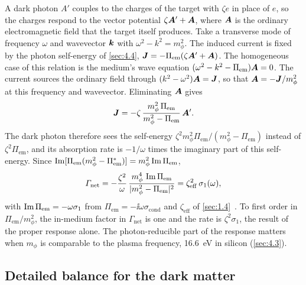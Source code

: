 A dark photon $A'$ couples to the charges of the target with $\zeta e$ in place of $e$, so the charges respond to the vector potential $\zeta\bm{A}' + \bm{A}$, where $\bm{A}$ is the ordinary electromagnetic field that the target itself produces. Take a transverse mode of frequency $\omega$ and wavevector $\bm{k}$ with $\omega^2 - k^2 = m_\phi^2$. The induced current is fixed by the photon self-energy of \cref{sec:4.4}, $\bm{J} = -\Pi_{\mathrm{em}}(\zeta\bm{A}' + \bm{A})$. The homogeneous case of this relation is the medium's wave equation $(\omega^2 - k^2 - \Pi_{\mathrm{em}})\bm{A} = 0$. The current sources the ordinary field through $(k^2 - \omega^2)\bm{A} = \bm{J}$, so that $\bm{A} = -\bm{J}/m_\phi^2$ at this frequency and wavevector. Eliminating $\bm{A}$ gives
\begin{equation*}
  \bm{J} = -\zeta\,\frac{m_\phi^2\,\Pi_{\mathrm{em}}}{m_\phi^2 - \Pi_{\mathrm{em}}}\,\bm{A}' .
\end{equation*}
The dark photon therefore sees the self-energy $\zeta^2m_\phi^2\Pi_{\mathrm{em}}/(m_\phi^2 - \Pi_{\mathrm{em}})$ instead of $\zeta^2\Pi_{\mathrm{em}}$, and its absorption rate is $-1/\omega$ times the imaginary part of this self-energy. Since $\operatorname{Im}[\Pi_{\mathrm{em}}(m_\phi^2 - \Pi_{\mathrm{em}}^*)] = m_\phi^2\operatorname{Im}\Pi_{\mathrm{em}}$,
\begin{equation*}
  \varGamma_{\mathrm{net}} = -\frac{\zeta^2}{\omega}\,\frac{m_\phi^4\,\operatorname{Im}\Pi_{\mathrm{em}}}{|m_\phi^2 - \Pi_{\mathrm{em}}|^2} = \zeta_{\mathrm{eff}}^2\,\sigma_1(\omega) ,
\end{equation*}
with $\operatorname{Im}\Pi_{\mathrm{em}} = -\omega\sigma_1$ from $\Pi_{\mathrm{em}} = -\ii\omega\sigma_{\mathrm{cond}}$ and $\zeta_{\mathrm{eff}}$ of \cref{sec:1.4}~\cites[Eqs.~(5) and (6)]{hochberg2017absorption}[Eqs.~(20)--(22)]{mitridate2021dark}. To first order in $\Pi_{\mathrm{em}}/m_\phi^2$, the in-medium factor in $\varGamma_{\mathrm{net}}$ is one and the rate is $\zeta^2\sigma_1$, the result of the proper response alone. The photon-reducible part of the response matters when $m_\phi$ is comparable to the plasma frequency, \SI{16.6}{eV} in silicon (\cref{sec:4.3}).

\subsection{Detailed balance for the dark matter}

